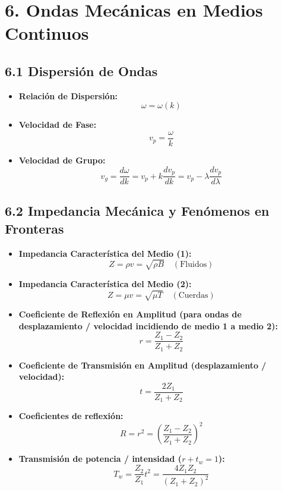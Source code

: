\documentclass[11pt,a4paper]{article}
\begin{document}
\section*{6. Ondas Mecánicas en Medios Continuos}

\subsection*{6.1 Dispersión de Ondas}

\begin{itemize}
  \item \textbf{Relación de Dispersión:}
  \[
    \omega = \omega(k)
  \]
  \item \textbf{Velocidad de Fase:}
  \[
    v_p = \frac{\omega}{k}
  \]
  \item \textbf{Velocidad de Grupo:}
  \[
    v_g = \frac{d\omega}{dk} = v_p + k \frac{dv_p}{dk} = v_p - \lambda \frac{dv_p}{d\lambda}
  \]
\end{itemize}

\subsection*{6.2 Impedancia Mecánica y Fenómenos en Fronteras}

\begin{itemize}
  \item \textbf{Impedancia Característica del Medio (1):}
  \[
    Z = \rho v = \sqrt{\rho B} \quad (\text{Fluidos})
  \]
  \item \textbf{Impedancia Característica del Medio (2):}
  \[
    Z = \mu v = \sqrt{\mu T} \quad (\text{Cuerdas})
  \]
  \item \textbf{Coeficiente de Reflexión en Amplitud (para ondas de desplazamiento / velocidad incidiendo de medio 1 a medio 2):}
  \[
    r = \frac{Z_1 - Z_2}{Z_1 + Z_2}
  \]
  \item \textbf{Coeficiente de Transmisión en Amplitud (desplazamiento / velocidad):}
  \[
    t = \frac{2Z_1}{Z_1 + Z_2}
  \]
  \item \textbf{Coeficientes de reflexión:}
  \[
    R = r^2 = \left( \frac{Z_1 - Z_2}{Z_1 + Z_2} \right)^2
  \]
  \item \textbf{Transmisión de potencia / intensidad ($r + t_w = 1$):}
  \[
    T_w = \frac{Z_2}{Z_1} t^2 = \frac{4 Z_1 Z_2}{(Z_1 + Z_2)^2}
  \]
\end{itemize}
\end{document}
